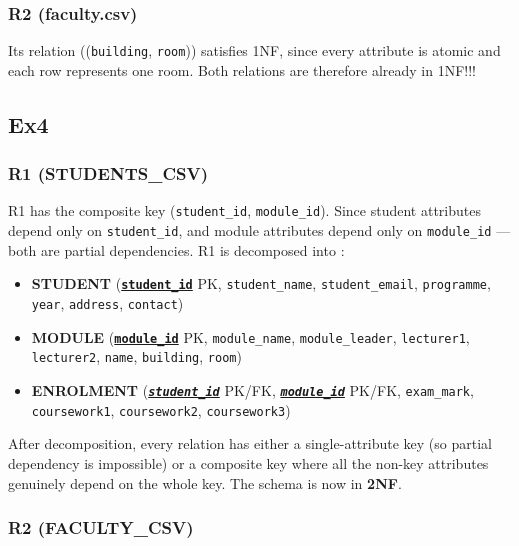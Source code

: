 \documentclass[12pt, a4paper]{report}
\begin{document}
\subsubsection*{R2 (faculty.csv)}

Its relation ((\texttt{building}, \texttt{room})) satisfies 1NF, since every attribute is atomic and each row represents one room. Both relations are therefore already in 1NF!!!








\subsection{Ex4}

\subsubsection*{R1 (STUDENTS\_CSV)}

R1 has the composite key (\texttt{student\_id}, \texttt{module\_id}). Since student attributes depend only on \texttt{student\_id}, and module attributes depend only on \texttt{module\_id} --- both are partial dependencies. R1 is decomposed into \cite{geeksforgeeks_2nf}:

\begin{itemize}
    \item \textbf{STUDENT} (\textbf{\underline{\texttt{student\_id}}} PK, \texttt{student\_name}, \texttt{student\_email}, \texttt{programme}, \texttt{year}, \texttt{address}, \texttt{contact})
    \item \textbf{MODULE} (\textbf{\underline{\texttt{module\_id}}} PK, \texttt{module\_name}, \texttt{module\_leader}, \texttt{lecturer1}, \texttt{lecturer2}, \texttt{name}, \texttt{building}, \texttt{room})
    \item \textbf{ENROLMENT} (\textbf{\underline{\textit{\texttt{student\_id}}}} PK/FK, \textbf{\underline{\textit{\texttt{module\_id}}}} PK/FK, \texttt{exam\_mark}, \texttt{coursework1}, \texttt{coursework2}, \texttt{coursework3})
\end{itemize}

After decomposition, every relation has either a single-attribute key (so partial dependency is impossible) or a composite key where all the non-key attributes genuinely depend on the whole key. The schema is now in \textbf{2NF}.

\subsubsection*{R2 (FACULTY\_CSV)}
\end{document}
